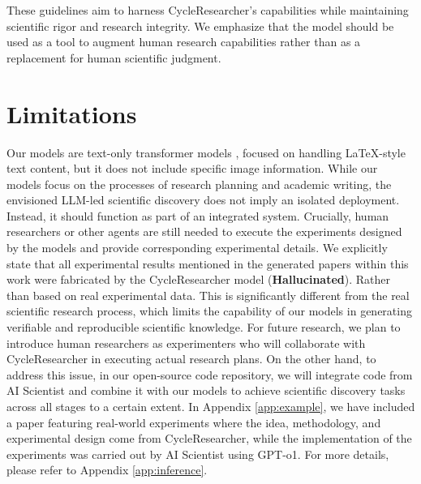 \documentclass{article} %
\begin{document}
These guidelines aim to harness CycleResearcher's capabilities while maintaining scientific rigor and research integrity. We emphasize that the model should be used as a tool to augment human research capabilities rather than as a replacement for human scientific judgment.

\section{Limitations}

Our models are text-only transformer models \citep{NIPS2017_3f5ee243}, focused on handling LaTeX-style text content, but it does not include specific image information. While our models focus on the processes of research planning and academic writing, the envisioned LLM-led scientific discovery does not imply an isolated deployment. Instead, it should function as part of an integrated system. Crucially, human researchers or other agents are still needed to execute the experiments designed by the models and provide corresponding experimental details. We explicitly state that all experimental results mentioned in the generated papers within this work were fabricated by the CycleResearcher model (\textbf{Hallucinated}). Rather than based on real experimental data. This is significantly different from the real scientific research process, which limits the capability of our models in generating verifiable and reproducible scientific knowledge. For future research, we plan to introduce human researchers as experimenters who will collaborate with CycleResearcher in executing actual research plans. On the other hand, to address this issue, in our open-source code repository, we will integrate code from AI Scientist  \citep{lu2024ai} and combine it with our models to achieve scientific discovery tasks across all stages to a certain extent. In Appendix \ref{app:example}, we have included a paper featuring real-world experiments where the idea, methodology, and experimental design come from CycleResearcher, while the implementation of the experiments was carried out by AI Scientist using GPT-o1. For more details, please refer to Appendix \ref{app:inference}.
\end{document}
